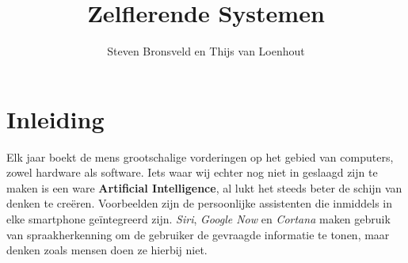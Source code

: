\documentclass[a4paper,titlepage]{article}
\title{Zelflerende Systemen}
\author{Steven Bronsveld en Thijs van Loenhout}
\begin{document}
\begin{titlepage}

\maketitle
\end{titlepage}

\renewcommand{\contentsname}{Inhoud}

\newpage
\tableofcontents
\newpage

\section{Inleiding}
Elk jaar boekt de mens grootschalige vorderingen op het gebied van computers, zowel hardware als software. Iets waar wij echter nog niet in geslaagd zijn te maken is een ware \textbf{ Artificial Intelligence}, al lukt het steeds beter de schijn van denken te cre\"eren. Voorbeelden zijn de persoonlijke assistenten die inmiddels in elke smartphone geïntegreerd zijn. \textit{Siri}, \textit{Google Now} en \textit{Cortana} maken gebruik van spraakherkenning om de gebruiker de gevraagde informatie te tonen, maar denken zoals mensen doen ze hierbij niet.


\newpage


\newpage


\newpage


\newpage


\newpage


\newpage


\newpage
\printbibheading[title={Bronnen},heading=bibnumbered]
\printbibliography[keyword=Deelvraag1,heading=subbibnumbered,title={Deelvraag 1}]
\printbibliography[keyword=Deelvraag2,heading=subbibnumbered,title={Deelvraag 2}]
\printbibliography[keyword=Deelvraag3,heading=subbibnumbered,title={Deelvraag 3}]
\printbibliography[keyword=Deelvraag4,heading=subbibnumbered,title={Deelvraag 4}]
\printbibliography[keyword=Deelvraag5,heading=subbibnumbered,title={Deelvraag 5}]
\printbibliography[keyword=Deelvraag6,heading=subbibnumbered,title={Deelvraag 6}]
\end{document}
